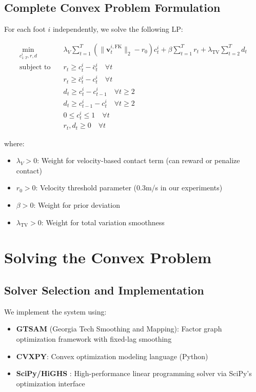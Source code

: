 \documentclass[conference]{IEEEtran}
\begin{document}
\subsection{Complete Convex Problem Formulation}
For each foot $i$ independently, we solve the following LP:

\begin{align}
\min_{c_{1:T}^i, r, d} \quad & \lambda_V \sum_{t=1}^{T} (\|\mathbf{v}_t^{i,\text{FK}}\|_2 - r_0) c_t^i + \beta \sum_{t=1}^{T} r_t + \lambda_{\text{TV}} \sum_{t=2}^{T} d_t \\
\text{subject to} \quad & r_t \geq c_t^i - \bar{c}_t^i \quad \forall t \\
& r_t \geq \bar{c}_t^i - c_t^i \quad \forall t \\
& d_t \geq c_t^i - c_{t-1}^i \quad \forall t \geq 2 \\
& d_t \geq c_{t-1}^i - c_t^i \quad \forall t \geq 2 \\
& 0 \leq c_t^i \leq 1 \quad \forall t \\
& r_t, d_t \geq 0 \quad \forall t
\end{align}

where:
\begin{itemize}
\item $\lambda_V > 0$: Weight for velocity-based contact term (can reward or penalize contact)
\item $r_0 > 0$: Velocity threshold parameter (0.3m/s in our experiments)
\item $\beta > 0$: Weight for prior deviation
\item $\lambda_{\text{TV}} > 0$: Weight for total variation smoothness
\end{itemize}

\section{Solving the Convex Problem}

\subsection{Solver Selection and Implementation}
We implement the system using:
\begin{itemize}
\item \textbf{GTSAM} (Georgia Tech Smoothing and Mapping): Factor graph optimization framework with fixed-lag smoothing
\item \textbf{CVXPY}: Convex optimization modeling language (Python)
\item \textbf{SciPy/HiGHS} \cite{highs}: High-performance linear programming solver via SciPy's optimization interface
\end{itemize}
\end{document}
